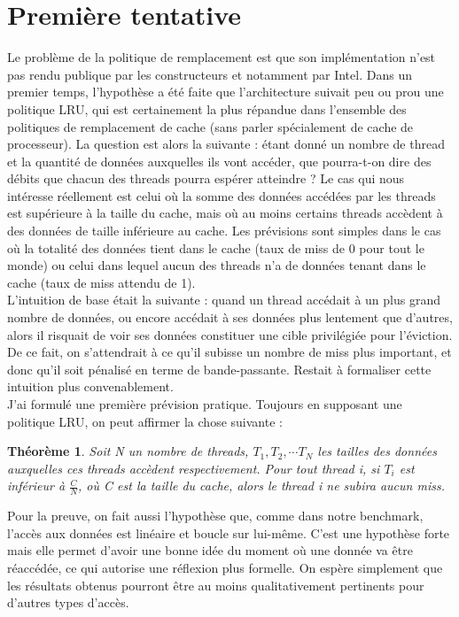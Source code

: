 \documentclass{report}
\begin{document}
\section{Première tentative}
Le problème de la politique de remplacement est que son implémentation n'est pas rendu publique
par les constructeurs et notamment par Intel. Dans un premier temps, l'hypothèse a été faite
que l'architecture suivait peu ou prou une politique LRU, qui est certainement la plus répandue
dans l'ensemble des politiques de remplacement de cache (sans parler spécialement de cache 
de processeur). La question est alors la suivante : étant donné un nombre de thread et la 
quantité de données auxquelles ils vont accéder, que pourra-t-on dire des débits que chacun 
des threads pourra espérer atteindre ? Le cas qui nous intéresse réellement est celui où
la somme des données accédées par les threads est supérieure à la taille du cache, mais où
au moins certains threads accèdent à des données de taille inférieure au cache. Les prévisions
sont simples dans le cas où la totalité des données tient dans le cache (taux de miss de 0 
pour tout le monde) ou celui dans lequel aucun des threads n'a de données tenant dans le
cache (taux de miss attendu de 1).
\\L'intuition de base était la suivante : quand un thread accédait à un plus grand nombre de
données, ou encore accédait à ses données plus lentement que d'autres, alors il risquait
de voir ses données constituer une cible privilégiée pour l'éviction. De ce fait, on s'attendrait
à ce qu'il subisse un nombre de miss plus important, et donc qu'il soit pénalisé en terme de
bande-passante. Restait à formaliser cette intuition plus convenablement.
\\J'ai formulé une première prévision pratique. Toujours en supposant une politique LRU, on
peut affirmer la chose suivante : 
\newtheorem{th1}{Théorème}
\begin{th1}
Soit N un nombre de threads, $T_1, T_2, \cdots T_N$ les tailles des données auxquelles ces threads
accèdent respectivement. Pour tout thread i, si $T_i$ est inférieur à $\frac{C}{N}$, où C est la 
taille du cache, alors le thread i ne subira aucun miss.
\end{th1}
Pour la preuve, on fait aussi l'hypothèse que, comme dans notre benchmark, l'accès aux données
est linéaire et boucle sur lui-même. C'est une hypothèse forte mais elle permet d'avoir une 
bonne idée du moment où une donnée va être réaccédée, ce qui autorise une réflexion plus formelle.
On espère simplement que les résultats obtenus pourront être au moins qualitativement pertinents
pour d'autres types d'accès.
 

\end{document}
